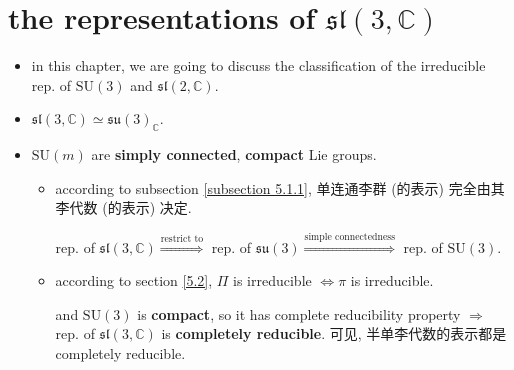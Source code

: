 \chapter{the representations of \texorpdfstring{$\mathfrak{sl}(3, \mathbb{C})$}{sl(3, C)}}
\begin{itemize}
	\item in this chapter, we are going to discuss the classification of the irreducible rep. of $\mathrm{SU}(3)$ and $\mathfrak{sl}(2, \mathbb{C})$.
	
	\item $\mathfrak{sl}(3, \mathbb{C}) \simeq \mathfrak{su}(3)_\mathbb{C}$.
	
	\item $\mathrm{SU}(m)$ are \textbf{simply connected}, \textbf{compact} Lie groups.
	\begin{itemize}
		\item according to subsection \ref{subsection 5.1.1}, 单连通李群 (的表示) 完全由其李代数 (的表示) 决定.
		
		rep. of $\mathfrak{sl}(3, \mathbb{C}) \overset{\text{restrict to}}{\Longrightarrow}$ rep. of $\mathfrak{su}(3) \overset{\text{simple connectedness}}{\Longrightarrow}$ rep. of $\mathrm{SU}(3)$.
		
		\item according to section \ref{5.2}, $\Pi$ is irreducible $\iff \pi$ is irreducible.
		
		and $\mathrm{SU}(3)$ is \textbf{compact}, so it has complete reducibility property $\Longrightarrow$ rep. of $\mathfrak{sl}(3, \mathbb{C})$ is \textbf{completely reducible}. 可见, 半单李代数的表示都是 completely reducible.
	\end{itemize}
\end{itemize}

